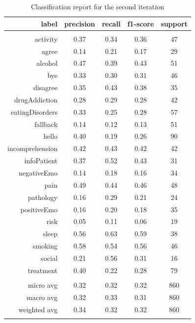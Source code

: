 \documentclass[11pt]{article}
\begin{document}
{\begin{table}[htb]
\begin{center}
\begin{tabular}{ |r|c|c|c|c| }
\hline
label  &    precision & recall & f1-score  & support\\ \hline 
\\ \hline 
activity 		& 0.37 &   0.34 &   0.36 & 47\\ \hline 
agree 			& 0.14 &   0.21 &   0.17 & 29\\ \hline 
alcohol 		& 0.47 &   0.39 &   0.43 & 51\\ \hline 
bye 			& 0.33 &   0.30 &   0.31 & 46\\ \hline 
disagree 		& 0.35 &   0.43 &   0.38 & 35\\ \hline 
drugAddiction 	& 0.28 &   0.29 &   0.28 & 42\\ \hline 
eatingDisorders & 0.33 &   0.25 &   0.28 & 57\\ \hline 
fallback 		& 0.14 &   0.12 &   0.13 & 51\\ \hline 
hello 			& 0.40 &   0.19 &   0.26 & 90\\ \hline 
incomprehension & 0.42 &   0.43 &   0.42 & 42\\ \hline 
infoPatient 	& 0.37 &   0.52 &   0.43 & 31\\ \hline 
negativeEmo 	& 0.14 &   0.18 &   0.16 & 34\\ \hline 
pain 			& 0.49 &   0.44 &   0.46 & 48\\ \hline 
pathology 		& 0.16 &   0.29 &   0.21 & 24\\ \hline 
positiveEmo 	& 0.16 &   0.20 &   0.18 & 35\\ \hline 
risk 			& 0.05 &   0.11 &   0.06 & 19\\ \hline 
sleep 			& 0.56 &   0.63 &   0.59 & 38\\ \hline 
smoking 		& 0.58 &   0.54 &   0.56 & 46\\ \hline 
social 			& 0.21 &   0.56 &   0.31 & 16\\ \hline 
treatment 		& 0.40 &   0.22 &   0.28 & 79\\ \hline 
\\ \hline 
micro avg &    0.32 &   0.32 &   0.32 &    860\\ \hline 
macro avg &    0.32 &   0.33 &   0.31 &    860\\ \hline 
weighted avg & 0.34 &   0.32 &   0.32 &    860\\ \hline 
\\ \hline 
\end{tabular}
\caption{Classification report for the second iteration}
\end{center}
\end{table}
\FloatBarrier

}
\end{document}
